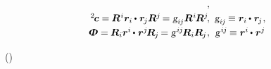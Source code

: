 \begin{equation}
\begin{array}{r@{\hspace{.5em}}c}
\hspace{-0.3ex} ,
\\[.25em]
%
{^2\hspace{-0.2ex}\bm{c}} = \hspace{-0.1ex} \bm{R}^{\hspace{.1ex}i} \bm{r}_i \hspace{-0.1ex} \dotp \hspace{.1ex} \bm{r}_{\hspace{-0.2ex}j} \bm{R}^j \hspace{-0.25ex}
= \textsl{g}_{i\hspace{-0.1ex}j} \bm{R}^{\hspace{.1ex}i} \hspace{-0.2ex} \bm{R}^j
\hspace{-0.3ex} , &
\textsl{g}_{i\hspace{-0.1ex}j} \hspace{-0.15ex} \equiv
\bm{r}_i \hspace{-0.1ex} \dotp \hspace{.1ex} \bm{r}_{\hspace{-0.2ex}j}
\hspace{.1ex} ,
\\[.25em]
%
\mathboldPhi = \hspace{-0.1ex} \bm{R}_i \bm{r}^i \hspace{-0.15ex} \dotp \hspace{.1ex} \bm{r}^j \hspace{-0.25ex} \bm{R}_{\hspace{-0.1ex}j} \hspace{-0.2ex}
= \textsl{g}^{\hspace{.2ex}i\hspace{-0.1ex}j} \hspace{-0.2ex} \bm{R}_i \bm{R}_{\hspace{-0.1ex}j}
\hspace{.1ex} , &
\textsl{g}^{\hspace{.2ex}i\hspace{-0.1ex}j} \hspace{-0.15ex} \equiv
\bm{r}^i \hspace{-0.15ex} \dotp \hspace{.1ex} \bm{r}^j
\end{array}
\end{equation}

\vspace{-0.2em} \noindent {}  ~() 

